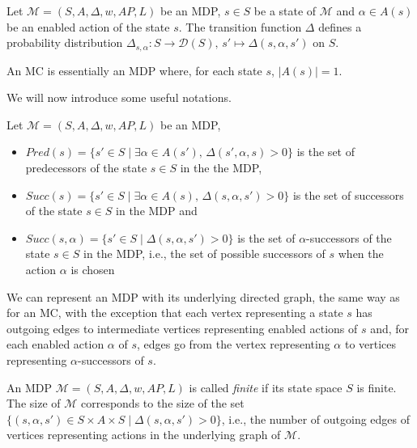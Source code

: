 \begin{property}
  Let $\mathcal{M} = (S,A, \Delta, w, AP, L)$ be an MDP, $s \in S$ be a state of $\mathcal{M}$ and $\alpha \in A(s)$ be an enabled action of the state $s$. The transition function $\Delta$ defines a probability distribution $\Delta_{s, \alpha}: S \rightarrow \mathcal{D}(S), \, s' \mapsto \Delta(s, \alpha, s')$ on $S$.
\end{property}
\begin{property}
  An MC is essentially an MDP where, for each state $s$, $|A(s)| = 1$.
\end{property}

We will now introduce some useful notations.

\begin{notation}
  Let $\mathcal{M}=(S, A, \Delta, w, AP, L)$ be an MDP,
  \begin{itemize}
    \item $Pred(s) = \{ s' \in S \; | \; \exists \alpha \in A(s'), \, \Delta(s', \alpha, s) > 0 \}$ is the set of predecessors of the state $s \in S$ in the the MDP,
    \item $Succ(s) = \{ s' \in S \; | \; \exists \alpha \in A(s), \, \Delta(s, \alpha, s') > 0 \}$ is the set of successors of the state $s \in S$ in the MDP and
    \item $Succ(s, \alpha) = \{ s' \in S \; | \; \Delta(s, \alpha, s') > 0 \}$
      is the set of $\alpha$-successors of the state $s \in S$ in the MDP, i.e., the set of possible successors of $s$ when the action $\alpha$ is chosen
  \end{itemize}
\end{notation}

We can represent an MDP with its underlying directed graph, the same way as for an MC, with the exception that each vertex representing a state $s$ has outgoing edges to intermediate vertices representing enabled actions of $s$ and, for each enabled action $\alpha$ of $s$, edges go from the vertex representing $\alpha$ to vertices representing $\alpha$-successors of $s$.

\begin{notation}
  An MDP $\mathcal{M}=(S, A, \Delta, w, AP, L)$ is called \textit{finite} if its state space $S$ is finite. The size of $\mathcal{M}$ corresponds to the size
  of the set $\{(s, \alpha, s') \in S \times A \times S \; | \; \Delta(s, \alpha, s') > 0 \}$, i.e., the number of outgoing edges of vertices representing actions in the underlying graph of $\mathcal{M}$.
\end{notation}

